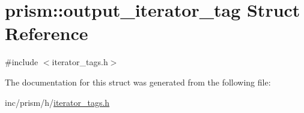 \hypertarget{structprism_1_1output__iterator__tag}{}\section{prism\+:\+:output\+\_\+iterator\+\_\+tag Struct Reference}
\label{structprism_1_1output__iterator__tag}


{\ttfamily \#include $<$iterator\+\_\+tags.\+h$>$}



The documentation for this struct was generated from the following file\+:\begin{DoxyCompactItemize}
\item 
inc/prism/h/\hyperlink{iterator__tags_8h}{iterator\+\_\+tags.\+h}\end{DoxyCompactItemize}
